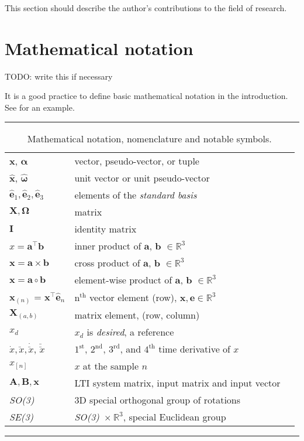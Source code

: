 This section should describe the author's contributions to the field of research.

\section{Mathematical notation}

TODO: write this if necessary

It is a good practice to define basic mathematical notation in the introduction.
See  for an example.

\begin{table*}[!h]
  \scriptsize
  \centering
  \noindent\rule{\textwidth}{0.5pt}
  \begin{tabular}{lll}
    $\mathbf{x}$, $\bm{\alpha}$ & vector, pseudo-vector, or tuple\\
    $\mathbf{\hat{x}}$, $\bm{\hat{\omega}}$& unit vector or unit pseudo-vector\\
    $\mathbf{\hat{e}}_1, \mathbf{\hat{e}}_2, \mathbf{\hat{e}}_3$ & elements of the \emph{standard basis} \\
    $\mathbf{X}, \bm{\Omega}$ & matrix \\
    $\mathbf{I}$ & identity matrix \\
    $x = \mathbf{a}^\intercal\mathbf{b}$ & inner product of $\mathbf{a}$, $\mathbf{b}$ $\in \mathbb{R}^3$\\
    $\mathbf{x} = \mathbf{a}\times\mathbf{b}$ & cross product of $\mathbf{a}$, $\mathbf{b}$ $\in \mathbb{R}^3$\\
    $\mathbf{x} = \mathbf{a}\circ\mathbf{b}$ & element-wise product of $\mathbf{a}$, $\mathbf{b}$ $\in \mathbb{R}^3$ \\
    $\mathbf{x}_{(n)}$ = $\mathbf{x}^\intercal\mathbf{\hat{e}}_n$ & $\mathrm{n}^{\mathrm{th}}$ vector element (row), $\mathbf{x}, \mathbf{e} \in \mathbb{R}^3$\\
    $\mathbf{X}_{(a,b)}$ & matrix element, (row, column)\\
    $x_{d}$ & $x_d$ is \emph{desired}, a reference\\
    $\dot{x}, \ddot{x}, \dot{\ddot{x}}$, $\ddot{\ddot{x}}$ & ${1^{\mathrm{st}}}$, ${2^{\mathrm{nd}}}$, ${3^{\mathrm{rd}}}$, and ${4^{\mathrm{th}}}$ time derivative of $x$\\
    $x_{[n]}$ & $x$ at the sample $n$ \\
    $\mathbf{A}, \mathbf{B}, \mathbf{x}$ & LTI system matrix, input matrix and input vector\\
    \emph{SO(3)} & 3D special orthogonal group of rotations\\
    \emph{SE(3)} & \emph{SO(3)}~$\times~\mathbb{R}^3$, special Euclidean group\\
  \end{tabular}
  \noindent\rule{\textwidth}{0.5pt}
  \caption{Mathematical notation, nomenclature and notable symbols.}
  \label{tab:mathematical_notation}
\end{table*}

